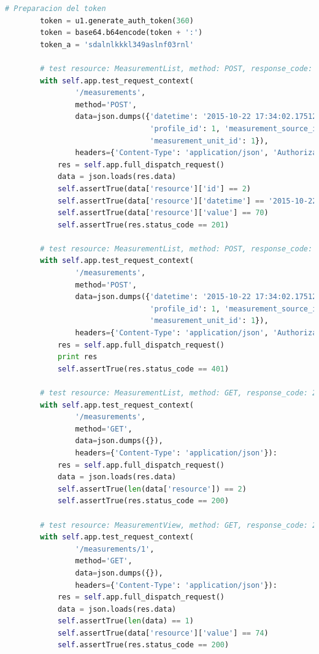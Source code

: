 \documentclass[a4paper,12pt]{article}
\begin{document}
\begin{itemize}
\begin{lstlisting}[language=Python]
        # Preparacion del token
        token = u1.generate_auth_token(360)
        token = base64.b64encode(token + ':')
        token_a = 'sdalnlkkkl349aslnf03rnl'

        # test resource: MeasurementList, method: POST, response_code: 201, con autorizacion
        with self.app.test_request_context(
                '/measurements',
                method='POST',
                data=json.dumps({'datetime': '2015-10-22 17:34:02.175126', 'value': 70, 'analysis_id': 1,
                                 'profile_id': 1, 'measurement_source_id': 1, 'measurement_type_id': 1,
                                 'measurement_unit_id': 1}),
                headers={'Content-Type': 'application/json', 'Authorization': 'Basic ' + token}):
            res = self.app.full_dispatch_request()
            data = json.loads(res.data)
            self.assertTrue(data['resource']['id'] == 2)
            self.assertTrue(data['resource']['datetime'] == '2015-10-22T17:34:02.175126')
            self.assertTrue(data['resource']['value'] == 70)
            self.assertTrue(res.status_code == 201)

        # test resource: MeasurementList, method: POST, response_code: 401, sin autorizacion, token invalido
        with self.app.test_request_context(
                '/measurements',
                method='POST',
                data=json.dumps({'datetime': '2015-10-22 17:34:02.175126', 'value': 68, 'analysis_id': 1,
                                 'profile_id': 1, 'measurement_source_id': 1, 'measurement_type_id': 1,
                                 'measurement_unit_id': 1}),
                headers={'Content-Type': 'application/json', 'Authorization': 'Basic ' + token_a}):
            res = self.app.full_dispatch_request()
            print res
            self.assertTrue(res.status_code == 401)

        # test resource: MeasurementList, method: GET, response_code: 200
        with self.app.test_request_context(
                '/measurements',
                method='GET',
                data=json.dumps({}),
                headers={'Content-Type': 'application/json'}):
            res = self.app.full_dispatch_request()
            data = json.loads(res.data)
            self.assertTrue(len(data['resource']) == 2)
            self.assertTrue(res.status_code == 200)

        # test resource: MeasurementView, method: GET, response_code: 200
        with self.app.test_request_context(
                '/measurements/1',
                method='GET',
                data=json.dumps({}),
                headers={'Content-Type': 'application/json'}):
            res = self.app.full_dispatch_request()
            data = json.loads(res.data)
            self.assertTrue(len(data) == 1)
            self.assertTrue(data['resource']['value'] == 74)
            self.assertTrue(res.status_code == 200)


\end{lstlisting}
\end{itemize}
\end{document}
